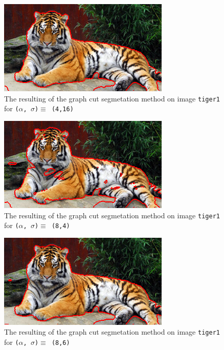 {  \begin{minipage}{0.45\linewidth}
    \begin{figure}[H]
      \includegraphics[scale=0.5]{./images/04/Q11/var_a_b/tiger1/graphcut2_a4_s16.png}
      \caption{The resulting of the graph cut segmetation method on image \texttt{tiger1} for
        \texttt{($\alpha$, $\sigma$)$ \equiv$ (4,16)}}
      \label{fig:04_tiger12_a4_s16}
    \end{figure}
    \vfill
    \begin{figure}[H]
      \includegraphics[scale=0.5]{./images/04/Q11/var_a_b/tiger1/graphcut2_a8_s4.png}
      \caption{The resulting of the graph cut segmetation method on image \texttt{tiger1} for
        \texttt{($\alpha$, $\sigma$)$ \equiv$ (8,4)}}
      \label{fig:04_tiger12_a8_s4}
    \end{figure}
    \vfill
    \begin{figure}[H]
      \includegraphics[scale=0.5]{./images/04/Q11/var_a_b/tiger1/graphcut2_a8_s6.png}
      \caption{The resulting of the graph cut segmetation method on image \texttt{tiger1} for
        \texttt{($\alpha$, $\sigma$)$ \equiv$ (8,6)}}
      \label{fig:04_tiger12_a8_s6}
    \end{figure}
  \end{minipage}
}


